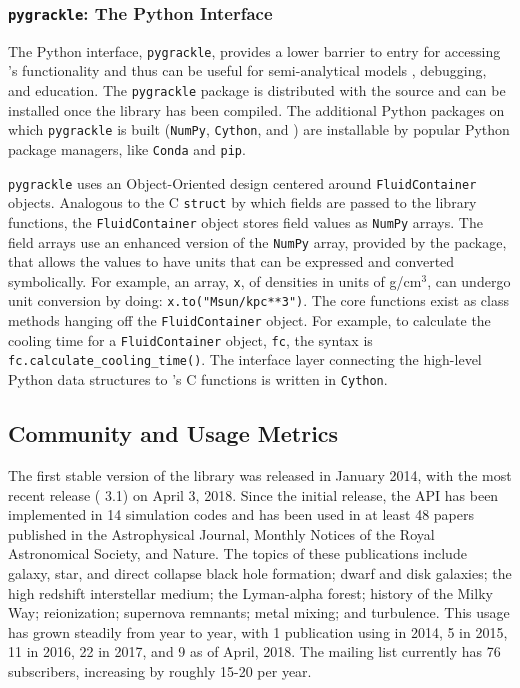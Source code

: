 \subsubsection{\texttt{pygrackle}: The Python Interface}

The Python interface, \texttt{pygrackle}, provides a lower barrier to
entry for accessing \grackle{}'s functionality and thus can be
useful for semi-analytical models \citep[e.g.,][]{2016ApJ...820...71C,
2016MNRAS.459.4209A}, debugging, and education.  The
\texttt{pygrackle} package is distributed with the \grackle{} source
and can be installed once the library has been compiled.  The
additional Python packages on which \texttt{pygrackle} is built
(\texttt{NumPy}, \texttt{Cython}, and \yt{}) are
installable by popular Python package managers, like \texttt{Conda}
and \texttt{pip}.

\texttt{pygrackle} uses an Object-Oriented design centered around
\texttt{FluidContainer} objects.  Analogous to the C \texttt{struct}
by which fields are passed to the \grackle{} library functions, the
\texttt{FluidContainer} object stores field values as \texttt{NumPy}
arrays.  The field arrays use an enhanced version of the
\texttt{NumPy} array, provided by the \yt{} package, that allows
the values to have units that can be expressed and converted
symbolically.  For example, an array, \texttt{x}, of densities in units of
g/cm$^{3}$, can undergo unit conversion by doing:
\texttt{x.to("Msun/kpc**3")}.  The core \grackle{} functions exist as
class methods hanging off the \texttt{FluidContainer} object.  For
example, to calculate the cooling time for a \texttt{FluidContainer}
object, \texttt{fc}, the syntax is
\texttt{fc.calculate\_cooling\_time()}.  The interface layer
connecting the high-level Python data structures to \grackle{}'s C
functions is written in \texttt{Cython}.

\subsection{Community and Usage Metrics}

The first stable version of the \grackle{} library was released in
January 2014, with the most recent release (\grackle{} 3.1) on April
3, 2018.  Since the initial release, the \grackle{} API has been
implemented in 14 simulation codes and has been used in at least 48 papers
published in the Astrophysical Journal, Monthly Notices of the Royal
Astronomical Society, and Nature.  The topics of these publications
include galaxy, star, and direct collapse black hole formation; dwarf
and disk galaxies; the high redshift interstellar medium; the
Lyman-alpha forest; history of the Milky Way; reionization; supernova
remnants; metal mixing; and turbulence.  This usage has grown steadily
from year to year, with 1 publication using \grackle{} in 2014, 5 in
2015, 11 in 2016, 22 in 2017, and 9 as of April, 2018.  The
\grackle{} mailing list currently has 76 subscribers, increasing by
roughly 15-20 per year.


